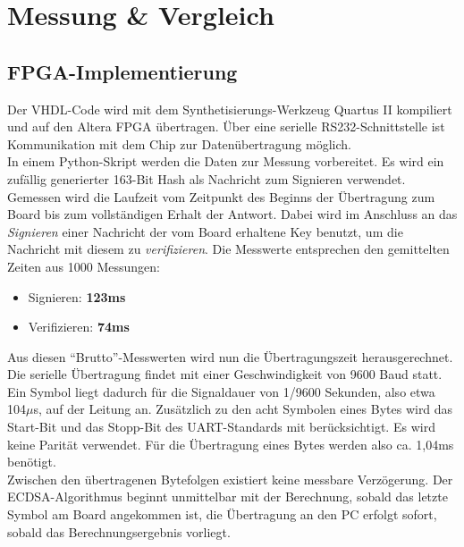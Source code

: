 
\chapter{Messung \& Vergleich} \label{sec:messung}

\section{FPGA-Implementierung}

Der VHDL-Code wird mit dem Synthetisierungs-Werkzeug Quartus II kompiliert und auf den Altera FPGA übertragen. Über eine serielle RS232-Schnittstelle ist Kommunikation mit dem Chip zur Datenübertragung möglich. \\

In einem Python-Skript werden die Daten zur Messung vorbereitet. Es wird ein zufällig generierter 163-Bit Hash als Nachricht zum Signieren verwendet. Gemessen wird die Laufzeit vom Zeitpunkt des Beginns der Übertragung zum Board bis zum vollständigen Erhalt der Antwort. Dabei wird im Anschluss an das \textit{Signieren} einer Nachricht der vom Board erhaltene Key benutzt, um die Nachricht mit diesem zu \textit{verifizieren}. Die Messwerte entsprechen den gemittelten Zeiten aus 1000 Messungen: \\

\begin{itemize}
	\item Signieren: \textbf{123ms}\\
	\item Verifizieren: \textbf{74ms}\\
\end{itemize}

Aus diesen ``Brutto''-Messwerten wird nun die Übertragungszeit herausgerechnet. Die serielle Übertragung findet mit einer Geschwindigkeit von 9600 Baud statt. Ein Symbol liegt dadurch für die Signaldauer von 1/9600 Sekunden, also etwa 104$\mu$s, auf der Leitung an. Zusätzlich zu den acht Symbolen eines Bytes wird das Start-Bit und das Stopp-Bit des UART-Standards mit berücksichtigt. Es wird keine Parität verwendet. Für die Übertragung eines Bytes werden also ca. 1,04ms benötigt. \\

Zwischen den übertragenen Bytefolgen existiert keine messbare Verzögerung. Der ECDSA-Algorithmus beginnt unmittelbar mit der Berechnung, sobald das letzte Symbol am Board angekommen ist, die Übertragung an den PC erfolgt sofort, sobald das Berechnungsergebnis vorliegt. \\

